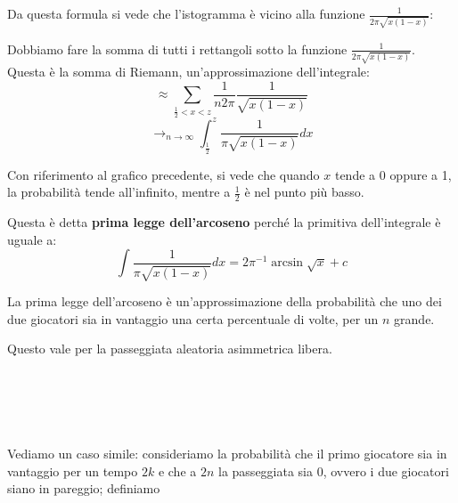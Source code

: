 \documentclass[a4paper,12pt]{book}
\begin{document}
Da questa formula si vede che l'istogramma è vicino alla funzione $ \frac{1}{2\pi\sqrt{x(1-x)}} $:


Dobbiamo fare la somma di tutti i rettangoli sotto la funzione $ \frac{1}{2\pi\sqrt{x(1-x)}} $. Questa è la somma di Riemann, un'approssimazione dell'integrale:
$$ \approx \sum_{\frac{1}{2} < x < z} \frac{1}{n2\pi} \frac{1}{\sqrt{x(1-x)}} $$
$$ \to_{n \to \infty} \int_{\frac{1}{2}}^{z} \frac{1}{\pi \sqrt{x(1-x)}} dx$$ 

Con riferimento al grafico precedente, si vede che quando $ x $ tende a 0 oppure a 1, la probabilità tende all'infinito, mentre a $ \frac{1}{2} $ è nel punto più basso. 

Questa è detta \textbf{prima legge dell'arcoseno} perché la primitiva dell'integrale è uguale a:
$$ \int \frac{1}{\pi \sqrt{x(1-x)}} dx = 2\pi^{-1} \arcsin {\sqrt{x}} + c$$

La prima legge dell'arcoseno è un'approssimazione della probabilità che uno dei due giocatori sia in vantaggio una certa percentuale di volte, per un $ n $ grande. 

Questo vale per la passeggiata aleatoria asimmetrica libera. 
\\
\\
\\
\\
\\
\\
Vediamo un caso simile: consideriamo la probabilità che il primo giocatore sia in vantaggio per un tempo $ 2k $ e che a $ 2n $ la passeggiata sia 0, ovvero i due giocatori siano in pareggio; definiamo
\end{document}
